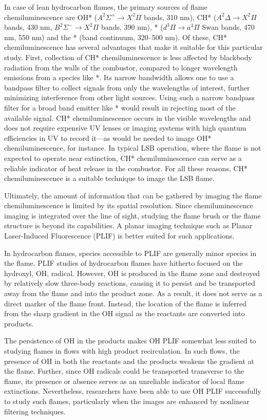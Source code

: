 In case of lean hydrocarbon flames, the primary sources of flame chemiluminescence are OH* (\(A^2\Sigma^+\rightarrow X^2\Pi\) bands, 310 nm), CH* (\(A^2\Delta\rightarrow X^2\Pi\) bands, 430 nm, \(B^2\Sigma^-\rightarrow X^2\Pi\) bands, 390 nm), * (\(d^3\Pi\rightarrow a^3\Pi\) Swan bands, 470 nm, 550 nm) and the * (band continuum, 320--500 nm).
Of these, CH* chemiluminescence has several advantages that make it suitable for this particular study.
First, collection of CH* chemiluminescence is less affected by blackbody radiation from the walls of the combustor, compared to longer wavelength emissions from a species like *.
Its narrow bandwidth allows one to use a bandpass filter to collect signals from only the wavelengths of interest, further minimizing interference from other light sources.
Using such a narrow bandpass filter for a broad band emitter like * would result in rejecting most of the available signal.
CH* chemiluminescence occurs in the visible wavelengths and does not require expensive UV lenses or imaging systems with high quantum efficiencies in UV to record it---as would be needed to image OH* chemiluminescence, for instance.
In typical LSB operation, where the flame is not expected to operate near extinction, CH* chemiluminescence can serve as a reliable indicator of heat release in the combustor.
For all these reasons, CH* chemiluminescence is a suitable technique to image the LSB flame.

Ultimately, the amount of information that can be gathered by imaging the flame chemiluminescence is limited by its spatial resolution.
Since chemiluminescence imaging is integrated over the line of sight, studying the flame brush or the flame structure is beyond its capabilities.
A planar imaging technique such as Planar Laser-Induced Fluorescence (PLIF) is better suited for such applications.

In hydrocarbon flames, species accessible to PLIF are generally minor species in the flame.
PLIF studies of hydrocarbon flames have hitherto focused on the hydroxyl, OH, radical.
However, OH is produced in the flame zone and destroyed by relatively slow three-body reactions, causing it to persist and be transported away from the flame and into the product zone.\cite{1990-barlow}
As a result, it does not serve as a direct marker of the flame front.
Instead, the location of the flame is inferred from the sharp gradient in the OH signal as the reactants are converted into products.

The persistence of OH in the products makes OH PLIF somewhat less suited to studying flames in flows with high product recirculation.
In such flows, the presence of OH in both the reactants and the products weakens the gradient at the flame.
Further, since OH radicals could be transported transverse to the flame, its presence or absence serves as an unreliable indicator of local flame extinctions.
Nevertheless, researchers have been able to use OH PLIF successfully\cite{1999-kaminski,2005-hult} to study such flames, particularly when the images are enhanced by nonlinear filtering techniques.\cite{2000-malm,2001-abu-gharbieh}

